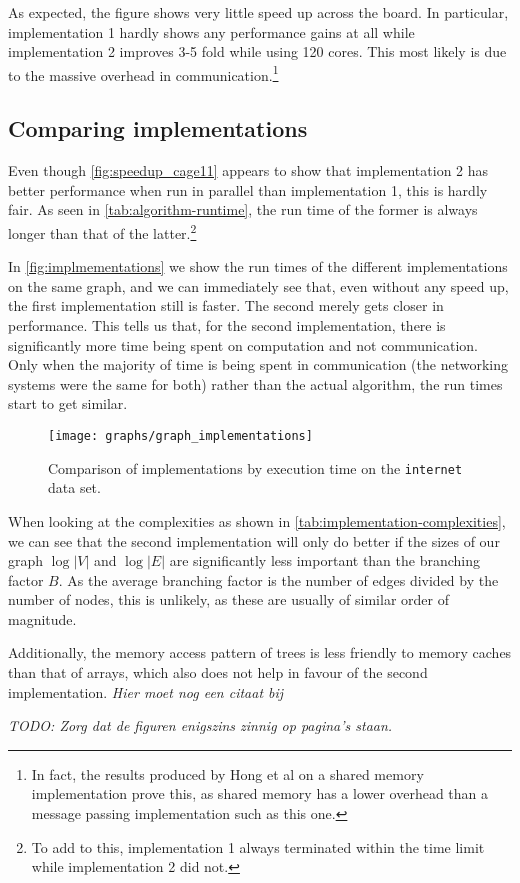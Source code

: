 As expected, the figure shows very little speed up across the board. In particular, implementation 1 hardly shows any performance gains at all while implementation 2 improves 3-5 fold while using 120 cores. This most likely is due to the massive overhead in communication.\footnote{In fact, the results produced by Hong et al \cite{LockFreeMultithreadedMaxFlow} on a shared memory implementation prove this, as shared memory has a lower overhead than a message passing implementation such as this one.}

\subsection{Comparing implementations}
Even though \autoref{fig:speedup_cage11} appears to show that implementation 2 has better performance when run in parallel than implementation 1, this is hardly fair. As seen in \autoref{tab:algorithm-runtime}, the run time of the former is always longer than that of the latter.\footnote{To add to this, implementation 1 always terminated within the time limit while implementation 2 did not.}

In \autoref{fig:implmementations} we show the run times of the different implementations on the same graph, and we can immediately see that, even without any speed up, the first implementation still is faster. The second merely gets closer in performance. This tells us that, for the second implementation, there is significantly more time being spent on computation and not communication. Only when the majority of time is being spent in communication (the networking systems were the same for both) rather than the actual algorithm, the run times start to get similar.

\begin{figure}[b!]
	\centering
  \texttt{[image: graphs/graph\_implementations]}
  \caption{Comparison of implementations by execution time on the \texttt{internet} data set.}
  \label{fig:implmementations}
\end{figure}

When looking at the complexities as shown in \autoref{tab:implementation-complexities}, we can see that the second implementation will only do better if the sizes of our graph $\log |V|$ and $\log |E|$ are significantly less important than the branching factor $B$. As the average branching factor is the number of edges divided by the number of nodes, this is unlikely, as these are usually of similar order of magnitude.

Additionally, the memory access pattern of trees is less friendly to memory caches than that of arrays, which also does not help in favour of the second implementation. \emph{Hier moet nog een citaat bij}

\emph{TODO: Zorg dat de figuren enigszins zinnig op pagina's staan.}